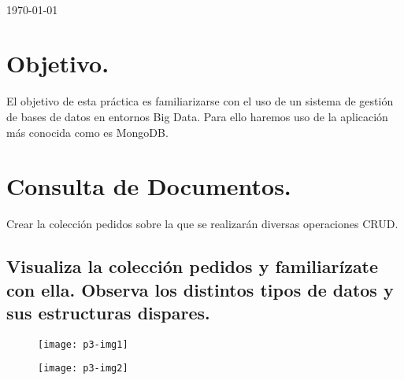 \documentclass[10pt]{article}
\begin{document}
\begin{center}
 		\\																		%
\vspace{2cm} 																				
\begin{center}																					
{\large \today}																	%
 			\end{center}												  						
\end{center}							 											
																					
\newpage																		

\tableofcontents 

\newpage

\section{Objetivo.}

El objetivo de esta práctica es familiarizarse con el uso de un sistema de gestión de bases de datos en entornos Big Data. Para ello haremos uso de la aplicación más conocida como es MongoDB.\\


\section{Consulta de Documentos.} 

Crear la colección pedidos sobre la que se realizarán diversas operaciones CRUD.

\subsection{Visualiza la colección pedidos y familiarízate con ella. Observa los distintos tipos de datos y sus estructuras dispares.}

 \begin{figure}[H]
	\begin{center}
 		\texttt{[image: p3-img1]}
	\end{center} 
\end{figure}

 \begin{figure}[H]
	\begin{center}
 		\texttt{[image: p3-img2]}
	\end{center} 
\end{figure}
\end{document}
